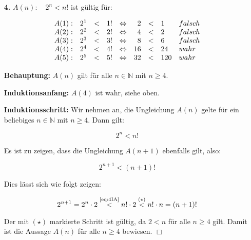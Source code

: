 \documentclass[a4paper,10pt]{scrartcl}
\begin{document}
\begin{enumerate}
\begin{enumerate}
        \end{enumerate}

    \vspace{2cm}

    \item[\textbf{4.}]
        $A(n): \hspace{1em}2^n < n!$ ist gültig für:

        $$\begin{array}{l rcl c rcl l}
            A(1): & 2^1 &<& 1! &\Leftrightarrow&  2 &<&  1 & falsch\\
            A(2): & 2^2 &<& 2! &\Leftrightarrow&  4 &<&  2 & falsch\\
            A(3): & 2^3 &<& 3! &\Leftrightarrow&  8 &<&  6 & falsch\\
            A(4): & 2^4 &<& 4! &\Leftrightarrow& 16 &<& 24 & wahr\\
            A(5): & 2^5 &<& 5! &\Leftrightarrow& 32 &<&120 & wahr\\
        \end{array}$$

        \textbf{Behauptung:} $A(n)$ gilt für alle $n \in \mathbb{N}$ mit $n \geq 4$.

        \textbf{Induktionsanfang:} $A(4)$ ist wahr, siehe oben.

        \textbf{Induktionsschritt:} Wir nehmen an, die Ungleichung $A(n)$ gelte für ein beliebiges
        $n \in \mathbb{N}$ mit $n \geq 4$. Dann gilt:

        \begin{equation}\label{eq:4IA}\tag{IA}
            2^n < n!
        \end{equation}

        Es ist zu zeigen, dass die Ungleichung $A(n + 1)$ ebenfalls gilt, also:

        \begin{equation}\label{eq:4IS1}
            2^{n+1} < (n+1)!
        \end{equation}

        Dies lässt sich wie folgt zeigen:

        \begin{equation}\label{eq:4IS2}
            2^{n+1} = 2^n \cdot 2 \overset{\text{\scriptsize\eqref{eq:4IA}}}{<}
            n! \cdot 2 \overset{(\star)}{<} n! \cdot n = (n+1)!
        \end{equation}

        Der mit $(\star)$ markierte Schritt ist gültig, da $2 < n$ für alle $n \geq 4$ gilt. Damit ist die Aussage
        $A(n)$ für alle $n \geq 4$ bewiesen. $\Box$

\end{enumerate}
\end{document}
